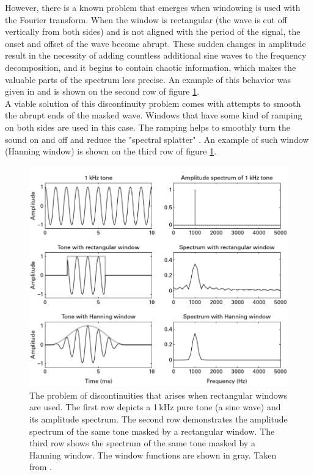 However, there is a known problem that emerges when windowing is used with the Fourier transform. When the window is rectangular (the wave is cut off vertically from both sides) and is not aligned with the period of the signal, the onset and offset of the wave become abrupt. These sudden changes in amplitude result in the necessity of adding countless additional sine waves to the frequency decomposition, and it begins to contain chaotic information, which makes the valuable parts of the spectrum less precise. An example of this behavior was given in \cite{Schnupp2011} and is shown on the second row of figure \ref{img:windowing_example}.\\

A viable solution of this discontinuity problem comes with attempts to smooth the abrupt ends of the masked wave. Windows that have some kind of ramping on both sides are used in this case. The ramping helps to smoothly turn the sound on and off and reduce the "spectral splatter" \cite{Schnupp2011}. An example of such window (Hanning window) is shown on the third row of figure \ref{img:windowing_example}.\\

\begin{figure}[h]
	\centering
	\includegraphics[height=0.5\textheight]{include/windowing_example}
	\caption[An example of windowing and the problem of discontinuities]{The problem of discontinuities that arises when rectangular windows are used. The first row depicts a 1\,kHz pure tone (a sine wave) and its amplitude spectrum. The second row demonstrates the amplitude spectrum of the same tone masked by a rectangular window. The third row shows the spectrum of the same tone masked by a Hanning window. The window functions are shown in gray. Taken from \cite{Schnupp2011}.}
	\label{img:windowing_example}
\end{figure}

